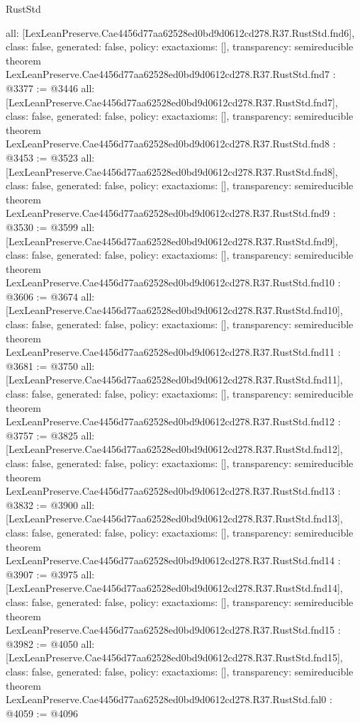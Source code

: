 \begin{lexlean}{RustStd}
\begin{coremodule}
{  all: [LexLeanPreserve.Cae4456d77aa62528ed0bd9d0612cd278.R37.RustStd.fnd6],
  class: false,
  generated: false,
  policy: exact{axioms: []},
  transparency: semireducible
}
theorem LexLeanPreserve.Cae4456d77aa62528ed0bd9d0612cd278.R37.RustStd.fnd7 : @3377 := @3446 {
  all: [LexLeanPreserve.Cae4456d77aa62528ed0bd9d0612cd278.R37.RustStd.fnd7],
  class: false,
  generated: false,
  policy: exact{axioms: []},
  transparency: semireducible
}
theorem LexLeanPreserve.Cae4456d77aa62528ed0bd9d0612cd278.R37.RustStd.fnd8 : @3453 := @3523 {
  all: [LexLeanPreserve.Cae4456d77aa62528ed0bd9d0612cd278.R37.RustStd.fnd8],
  class: false,
  generated: false,
  policy: exact{axioms: []},
  transparency: semireducible
}
theorem LexLeanPreserve.Cae4456d77aa62528ed0bd9d0612cd278.R37.RustStd.fnd9 : @3530 := @3599 {
  all: [LexLeanPreserve.Cae4456d77aa62528ed0bd9d0612cd278.R37.RustStd.fnd9],
  class: false,
  generated: false,
  policy: exact{axioms: []},
  transparency: semireducible
}
theorem LexLeanPreserve.Cae4456d77aa62528ed0bd9d0612cd278.R37.RustStd.fnd10 : @3606 := @3674 {
  all: [LexLeanPreserve.Cae4456d77aa62528ed0bd9d0612cd278.R37.RustStd.fnd10],
  class: false,
  generated: false,
  policy: exact{axioms: []},
  transparency: semireducible
}
theorem LexLeanPreserve.Cae4456d77aa62528ed0bd9d0612cd278.R37.RustStd.fnd11 : @3681 := @3750 {
  all: [LexLeanPreserve.Cae4456d77aa62528ed0bd9d0612cd278.R37.RustStd.fnd11],
  class: false,
  generated: false,
  policy: exact{axioms: []},
  transparency: semireducible
}
theorem LexLeanPreserve.Cae4456d77aa62528ed0bd9d0612cd278.R37.RustStd.fnd12 : @3757 := @3825 {
  all: [LexLeanPreserve.Cae4456d77aa62528ed0bd9d0612cd278.R37.RustStd.fnd12],
  class: false,
  generated: false,
  policy: exact{axioms: []},
  transparency: semireducible
}
theorem LexLeanPreserve.Cae4456d77aa62528ed0bd9d0612cd278.R37.RustStd.fnd13 : @3832 := @3900 {
  all: [LexLeanPreserve.Cae4456d77aa62528ed0bd9d0612cd278.R37.RustStd.fnd13],
  class: false,
  generated: false,
  policy: exact{axioms: []},
  transparency: semireducible
}
theorem LexLeanPreserve.Cae4456d77aa62528ed0bd9d0612cd278.R37.RustStd.fnd14 : @3907 := @3975 {
  all: [LexLeanPreserve.Cae4456d77aa62528ed0bd9d0612cd278.R37.RustStd.fnd14],
  class: false,
  generated: false,
  policy: exact{axioms: []},
  transparency: semireducible
}
theorem LexLeanPreserve.Cae4456d77aa62528ed0bd9d0612cd278.R37.RustStd.fnd15 : @3982 := @4050 {
  all: [LexLeanPreserve.Cae4456d77aa62528ed0bd9d0612cd278.R37.RustStd.fnd15],
  class: false,
  generated: false,
  policy: exact{axioms: []},
  transparency: semireducible
}
theorem LexLeanPreserve.Cae4456d77aa62528ed0bd9d0612cd278.R37.RustStd.fal0 : @4059 := @4096 {
}
\end{coremodule}
\end{lexlean}
